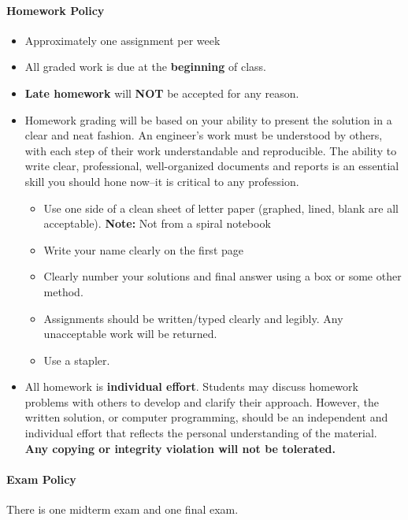 \documentclass[11pt, reqno]{article}   	%
\begin{document}
\paragraph{Homework Policy}

\begin{itemize}
    \item Approximately one assignment per week
    \item All graded work is due at the \textbf{beginning} of class.
    \item \textbf{Late homework} will \textbf{NOT} be accepted for any reason.
    \item Homework grading will be based on your ability to present the solution in a clear and neat fashion.
    An engineer's work must be understood by others, with each step of their work understandable and reproducible. 
    The ability to write clear, professional, well-organized documents and reports is an essential skill you should hone now--it is critical to any profession.
    \begin{itemize}
        \item Use one side of a clean sheet of letter paper (graphed, lined, blank are all acceptable).
        \textbf{Note:} Not from a spiral notebook
        \item Write your name clearly on the first page
        \item Clearly number your solutions and final answer using a box or some other method.
        \item Assignments should be written/typed clearly and legibly. 
        Any unacceptable work will be returned.
        \item Use a stapler.
    \end{itemize}
    \item All homework is \textbf{individual effort}.
    Students may discuss homework problems with others to develop and clarify their approach.
    However, the written solution, or computer programming, should be an independent and individual effort that reflects the personal understanding of the material.
    \textbf{Any copying or integrity violation will not be tolerated.}
\end{itemize}

\paragraph{Exam Policy}
There is one midterm exam and one final exam. 
\end{document}
